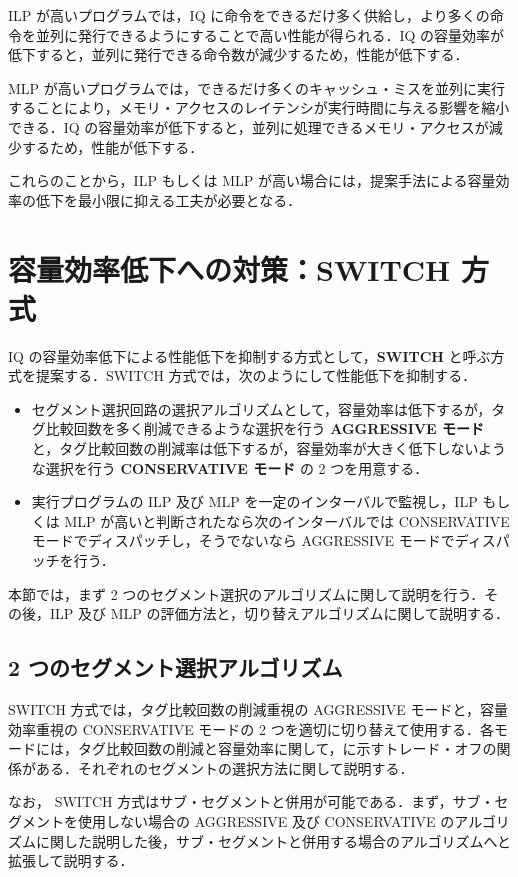 ILP が高いプログラムでは，IQ に命令をできるだけ多く供給し，より多くの命令を並列に発行できるようにすることで高い性能が得られる．IQ の容量効率が低下すると，並列に発行できる命令数が減少するため，性能が低下する．

MLP が高いプログラムでは，できるだけ多くのキャッシュ・ミスを並列に実行することにより，メモリ・アクセスのレイテンシが実行時間に与える影響を縮小できる．IQ の容量効率が低下すると，並列に処理できるメモリ・アクセスが減少するため，性能が低下する．

これらのことから，ILP もしくは MLP が高い場合には，提案手法による容量効率の低下を最小限に抑える工夫が必要となる．

\section{容量効率低下への対策：SWITCH 方式}
\label{sec:switch_scheme}
IQ の容量効率低下による性能低下を抑制する方式として，\textbf{SWITCH} と呼ぶ方式を提案する．SWITCH 方式では，次のようにして性能低下を抑制する．
\begin{itemize}
  \item セグメント選択回路の選択アルゴリズムとして，容量効率は低下するが，タグ比較回数を多く削減できるような選択を行う \textbf{AGGRESSIVE モード} と，タグ比較回数の削減率は低下するが，容量効率が大きく低下しないような選択を行う \textbf{CONSERVATIVE モード} の 2 つを用意する．
  \item 実行プログラムの ILP 及び MLP を一定のインターバルで監視し，ILP もしくは MLP が高いと判断されたなら次のインターバルでは CONSERVATIVE モードでディスパッチし，そうでないなら AGGRESSIVE モードでディスパッチを行う．
\end{itemize}

本節では，まず 2 つのセグメント選択のアルゴリズムに関して説明を行う．その後，ILP 及び MLP の評価方法と，切り替えアルゴリズムに関して説明する．

\subsection{2 つのセグメント選択アルゴリズム}
\label{sec:two_mode}
SWITCH 方式では，タグ比較回数の削減重視の AGGRESSIVE モードと，容量効率重視の CONSERVATIVE モードの 2 つを適切に切り替えて使用する．各モードには，タグ比較回数の削減と容量効率に関して，に示すトレード・オフの関係がある．それぞれのセグメントの選択方法に関して説明する．

なお， SWITCH 方式はサブ・セグメントと併用が可能である．まず，サブ・セグメントを使用しない場合の AGGRESSIVE 及び CONSERVATIVE のアルゴリズムに関した説明した後，サブ・セグメントと併用する場合のアルゴリズムへと拡張して説明する．

